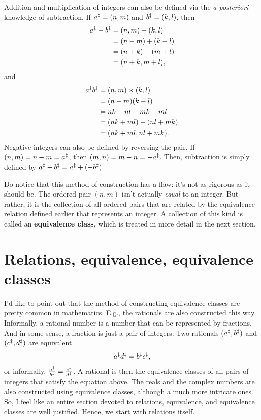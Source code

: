 Addition and multiplication of integers can also be defined via the \emph{a posteriori} knowledge of
subtraction. If $a^{\ddagger} = (n, m)$ and $b^{\ddagger} = (k, l)$, then
\begin{align}
  a^{\ddagger} + b^{\ddagger} & = (n, m) + (k, l)   \\
                      & = (n - m) + (k - l) \\
                      & = (n + k) - (m + l) \\
                      & = (n + k, m + l),
\end{align}
and
\begin{align}
  a^{\ddagger}b^{\ddagger} & = (n, m) \times (k, l)  \\
                   & = (n - m)(k - l)        \\
                   & = nk - nl - mk + ml     \\
                   & = (nk + ml) - (nl + mk) \\
                   & = (nk + ml, nl + mk).
\end{align}
Negative integers can also be defined by reversing the pair. If $(n, m) = n - m = a^{\ddagger}$, then
$(m, n) = m - n = -a^{\ddagger}$. Then, subtraction is simply defined by
$a^{\ddagger} - b^{\ddagger} = a^{\ddagger} + (-b^{\ddagger})$

Do notice that this method of construction has a flaw: it's not as rigorous as it should be. The
ordered pair \((n, m)\) isn't actually \emph{equal} to an integer. But rather, it is the collection
of all ordered pairs that are related by the equivalence relation defined earlier that represents an
integer. A collection of this kind is called an \textbf{equivalence class}, which is treated in more
detail in the next section.

\section{Relations, equivalence, equivalence classes}

I'd like to point out that the method of constructing equivalence classes are pretty common in
mathematics. E.g., the rationals are also constructed this way. Informally, a rational number is a
number that can be represented by fractions. And in some sense, a fraction is just a pair of
integers. Two rationals \((a^{\ddagger}, b^{\ddagger})\) and \((c^{\ddagger}, d^{\ddagger})\) are equivalent \ifft
\begin{equation}
  a^{\ddagger} d^{\ddagger} = b^{\ddagger} c^{\ddagger},
\end{equation}
or informally, \(\frac{a^{\ddagger}}{b^{\ddagger}} = \frac{c^{\ddagger}}{d^{\ddagger}}\). A rational is
then the equivalence classes of all pairs of integers that satisfy the equation
above. The reals and the complex numbers are also constructed using equivalence
classes, although a much more intricate ones. So, I feel like an entire section
devoted to relations, equivalence, and equivalence classes are well justified. Hence,
we start with relations itself.

